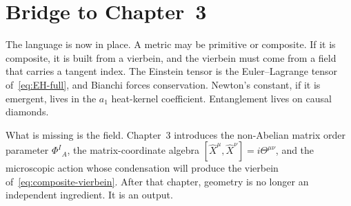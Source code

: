 \section{Bridge to Chapter~3}
\label{sec:ch2-bridge}

The language is now in place. A metric may be primitive or composite.
If it is composite, it is built from a vierbein, and the vierbein must
come from a field that carries a tangent index. The Einstein tensor is
the Euler--Lagrange tensor of~\eqref{eq:EH-full}, and Bianchi forces
conservation. Newton's constant, if it is emergent, lives in the
\(a_1\) heat-kernel coefficient. Entanglement lives on causal
diamonds.

What is missing is the field. Chapter~3 introduces the non-Abelian
matrix order parameter \(\Phi^I{}_A\), the matrix-coordinate algebra
\([\hat X^\mu,\hat X^\nu]=i\Theta^{\mu\nu}\), and the microscopic
action whose condensation will produce the vierbein
of~\eqref{eq:composite-vierbein}. After that chapter, geometry is no
longer an independent ingredient. It is an output.